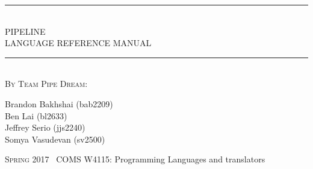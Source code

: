 \documentclass[./LRM_main.tex]{subfiles}
\begin{document}
  \begin{titlepage}
    \textheight
    \centering
    \vspace*{\baselineskip}
    \rule{\textwidth}{3pt}\\[\baselineskip]
    {\Huge PIPELINE \\[0.3\baselineskip] LANGUAGE REFERENCE MANUAL}\\[0.2\baselineskip]
    \rule{\textwidth}{3pt}\\[\baselineskip]
    \scshape
    \vspace*{2\baselineskip}
    By Team Pipe Dream: \\ %
    {\Large Brandon Bakhshai (bab2209) \\ Ben Lai (bl2633) \\ 
    Jeffrey Serio (jjs2240) \\ Somya Vasudevan (sv2500) \par}
    \vfill
    {\scshape Spring 2017} \ {\large COMS W4115: Programming Languages and translators}\par
  \end{titlepage}
  
\end{document}
